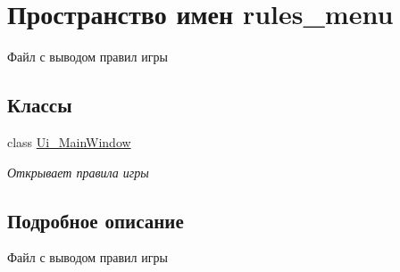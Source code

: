 \hypertarget{namespacerules__menu}{}\section{Пространство имен rules\+\_\+menu}
\label{namespacerules__menu}


Файл с выводом правил игры  


\subsection*{Классы}
\begin{DoxyCompactItemize}
\item 
class \mbox{\hyperlink{classrules__menu_1_1_ui___main_window}{Ui\+\_\+\+Main\+Window}}
\begin{DoxyCompactList}\small\item\em Открывает правила игры \end{DoxyCompactList}\end{DoxyCompactItemize}


\subsection{Подробное описание}
Файл с выводом правил игры 